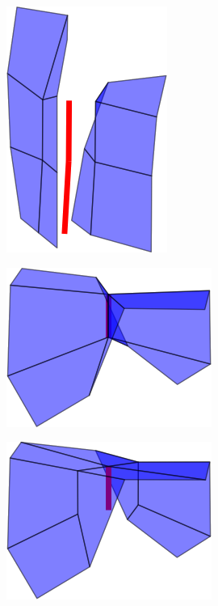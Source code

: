 \begin{figure}
\begin{center}
\begin{subfigure}[b]{.45\textwidth}
\end{subfigure}
\begin{subfigure}[b]{.45\textwidth}
\centering
\includegraphics[height = .17\textheight, width = .5\textwidth,keepaspectratio]{Pictures/SurfaceReconstruction/3DManifoldMIRes}
\end{subfigure}
\begin{subfigure}[b]{.45\textwidth}
\centering
\includegraphics[height = .17\textheight, width = .5\textwidth,keepaspectratio]{Pictures/SurfaceReconstruction/3DManifoldOI}
\end{subfigure}
\begin{subfigure}[b]{.45\textwidth}
\centering
\includegraphics[height = .17\textheight, width = .5\textwidth,keepaspectratio]{Pictures/SurfaceReconstruction/3DManifoldOIRes}

\end{subfigure}
\end{center}
\end{figure}

